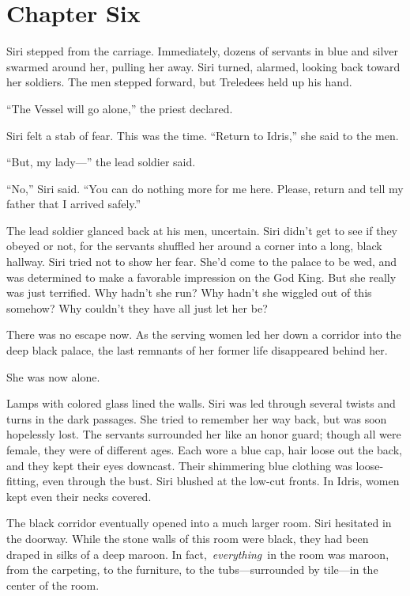 \section{Chapter Six}

Siri stepped from the carriage. Immediately, dozens of servants in blue and silver swarmed around her, pulling her away. Siri turned, alarmed, looking back toward her soldiers. The men stepped forward, but Treledees held up his hand.

“The Vessel will go alone,” the priest declared.

Siri felt a stab of fear. This was the time. “Return to Idris,” she said to the men.

“But, my lady—” the lead soldier said.

“No,” Siri said. “You can do nothing more for me here. Please, return and tell my father that I arrived safely.”

The lead soldier glanced back at his men, uncertain. Siri didn’t get to see if they obeyed or not, for the servants shuffled her around a corner into a long, black hallway. Siri tried not to show her fear. She’d come to the palace to be wed, and was determined to make a favorable impression on the God King. But she really was just terrified. Why hadn’t she run? Why hadn’t she wiggled out of this somehow? Why couldn’t they have all just let her be?

There was no escape now. As the serving women led her down a corridor into the deep black palace, the last remnants of her former life disappeared behind her.

She was now alone.

Lamps with colored glass lined the walls. Siri was led through several twists and turns in the dark passages. She tried to remember her way back, but was soon hopelessly lost. The servants surrounded her like an honor guard; though all were female, they were of different ages. Each wore a blue cap, hair loose out the back, and they kept their eyes downcast. Their shimmering blue clothing was loose-fitting, even through the bust. Siri blushed at the low-cut fronts. In Idris, women kept even their necks covered.

The black corridor eventually opened into a much larger room. Siri hesitated in the doorway. While the stone walls of this room were black, they had been draped in silks of a deep maroon. In fact,~\textit{everything}~in the room was maroon, from the carpeting, to the furniture, to the tubs—surrounded by tile—in the center of the room.


